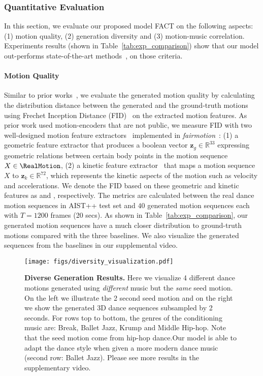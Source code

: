 \subsubsection{Quantitative Evaluation}
In this section, we evaluate our proposed model FACT on the following aspects: (1) motion quality, (2) generation diversity and (3) motion-music correlation. 
Experiments results (shown in Table~\ref{tab:exp_comparison}) show that our model out-performs state-of-the-art methods~\cite{li2020learning, huang2021, zhuang2020music2dance}, on those criteria.


\paragraph{Motion Quality} 
Similar to prior works~\cite{li2020learning, huang2021}, we evaluate the generated motion quality by calculating the distribution distance between the generated and the ground-truth motions using Frechet Inception Distance (FID)~\cite{heusel2017gans} on the extracted motion features. {As prior work used motion-encoders that are not public, we measure FID with two well-designed motion feature extractors~\cite{muller2005efficient, onuma2008fmdistance} implemented in \emph{fairmotion}~\cite{gopinath2020fairmotion}: (1) a geometric feature extractor that produces a boolean vector $\mathbf{z}_{g} \in \mathbb{R}^{33}$ expressing geometric relations between certain body points in the motion sequence $X \in \RealMotion$, (2) a kinetic feature extractor~\cite{onuma2008fmdistance} that maps a motion sequence $X$ to $\mathbf{z}_{k} \in \mathbb{R}^{72}$, which represents the kinetic aspects of the motion such as velocity and accelerations. We denote the FID based on these geometric and kinetic features as \FIDm and \FIDk, respectively.
The metrics are calculated between the real dance motion sequences in AIST++ test set and $40$ generated motion sequences each with $T=1200$ frames (20 secs). }
As shown in Table~\ref{tab:exp_comparison}, our generated motion sequences have a much closer distribution to ground-truth motions compared with the three baselines.
We also visualize the generated sequences from the baselines in our supplemental video.
\begin{figure}[t]
\vspace{-8mm}
\centering
\texttt{[image: figs/diversity\_visualization.pdf]}
\vspace{-1mm}
\caption{\textbf{Diverse Generation Results.} Here we visualize 4 different dance motions generated using \textit{different} music but the \textit{same} seed motion. 
On the left we illustrate the 2 second seed motion and on the right we show the generated 3D dance sequences subsampled by 2 seconds.  
For rows top to bottom, the genres of the conditioning music are: Break, Ballet Jazz, Krump and Middle Hip-hop. 
Note that the seed motion come from hip-hop dance.Our model is able to adapt the dance style when given a more modern dance music (second row: Ballet Jazz). Please see more results in the supplementary video. 
} 
\label{fig:diversity_vis}
\vspace{-5mm}
\end{figure} 
\vspace{-3mm}
